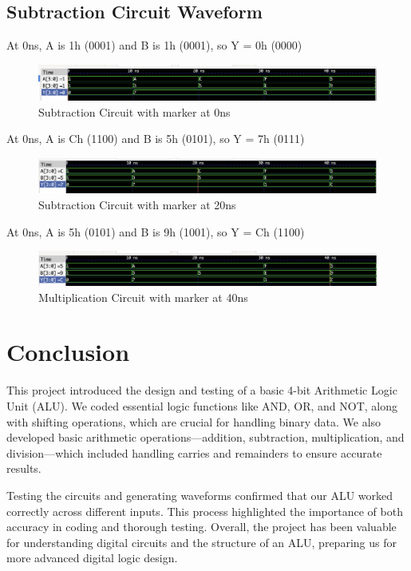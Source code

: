 \documentclass[12pt]{article}
\begin{document}
\subsection{Subtraction Circuit Waveform} 

At 0ns, A is 1h (0001) and B is 1h (0001), so Y = 0h (0000)  
\begin{figure}[H]
 \centering
 \includegraphics[width = 1.0\textwidth]{Subtraction/Subtraction-0ns.png}
 \caption{Subtraction Circuit with marker at 0ns}
 \label{fig:enter-label} 
\end{figure} 

At 0ns, A is Ch (1100) and B is 5h (0101), so Y = 7h (0111)  
 \begin{figure}[H]
 \centering 
\includegraphics[width = 1.0\textwidth]{Subtraction/Subtraction-20ns.png}
 \caption{Subtraction Circuit with marker at 20ns}
 \label{fig:enter-label}
 \end{figure}

 At 0ns, A is 5h (0101) and B is 9h (1001), so Y = Ch (1100)  
 \begin{figure}[H]
 \centering 
\includegraphics[width = 1.0\textwidth]{Subtraction/Subtraction-40ns.png}
 \caption{Multiplication Circuit with marker at 40ns}
 \label{fig:enter-label}
 \end{figure}


\section{Conclusion}

This project introduced the design and testing of a basic 4-bit Arithmetic Logic Unit (ALU). We coded essential logic functions like AND, OR, and NOT, along with shifting operations, which are crucial for handling binary data. We also developed basic arithmetic operations—addition, subtraction, multiplication, and division—which included handling carries and remainders to ensure accurate results.

Testing the circuits and generating waveforms confirmed that our ALU worked correctly across different inputs. This process highlighted the importance of both accuracy in coding and thorough testing. Overall, the project has been valuable for understanding digital circuits and the structure of an ALU, preparing us for more advanced digital logic design.
\end{document}
